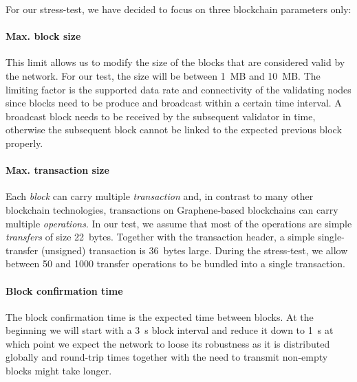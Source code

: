 For our stress-test, we have decided to focus on three blockchain parameters only:

\paragraph{Max. block size}
This limit allows us to modify the size of the blocks that are considered valid
by the network. For our test, the size will be between \SI{1}{MB} and
\SI{10}{MB}. The limiting factor is the supported data rate and connectivity of
the validating nodes since blocks need to be produce and broadcast within a
certain time interval. A broadcast block needs to be received by the subsequent
validator in time, otherwise the subsequent block cannot be linked to the
expected previous block properly.

\paragraph{Max. transaction size}
Each \emph{block} can carry multiple \emph{transaction} and, in contrast to
many other blockchain technologies, transactions on Graphene-based blockchains
can carry multiple \emph{operations}. In our test, we assume that most of the
operations are simple \emph{transfers} of size \SI{22}{bytes}. Together with
the transaction header, a simple single-transfer (unsigned) transaction is
\SI{36}{bytes} large. During the stress-test, we allow between \num{50} and
\num{1000} transfer operations to be bundled into a single transaction.

\paragraph{Block confirmation time}
The block confirmation time is the expected time between blocks. At the
beginning we will start with a \SI{3}{s} block interval and reduce it down to
\SI{1}{s} at which point we expect the network to loose its robustness as it
is distributed globally and round-trip times together with the need to transmit
non-empty blocks might take longer.
